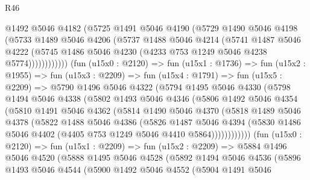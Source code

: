 \begin{lexlean}{R46}
\begin{coremodule}
                  @1492
                  @5046
                  @4182
                  (@5725
                    @1491
                    @5046
                    @4190
                    (@5729
                      @1490
                      @5046
                      @4198
                      (@5733
                        @1489
                        @5046
                        @4206
                        (@5737
                          @1488
                          @5046
                          @4214
                          (@5741
                            @1487
                            @5046
                            @4222
                            (@5745 @1486 @5046 @4230 (@4233 @753 @1249 @5046 @4238 @5774))))))))))))
        (fun (u15x0 : @2120) =>
        fun (u15x1 : @1736) =>
        fun (u15x2 : @1955) =>
        fun (u15x3 : @2209) =>
        fun (u15x4 : @1791) =>
        fun (u15x5 : @2209) =>
        @5790
          @1496
          @5046
          @4322
          (@5794
            @1495
            @5046
            @4330
            (@5798
              @1494
              @5046
              @4338
              (@5802
                @1493
                @5046
                @4346
                (@5806
                  @1492
                  @5046
                  @4354
                  (@5810
                    @1491
                    @5046
                    @4362
                    (@5814
                      @1490
                      @5046
                      @4370
                      (@5818
                        @1489
                        @5046
                        @4378
                        (@5822
                          @1488
                          @5046
                          @4386
                          (@5826
                            @1487
                            @5046
                            @4394
                            (@5830 @1486 @5046 @4402 (@4405 @753 @1249 @5046 @4410 @5864))))))))))))
        (fun (u15x0 : @2120) =>
        fun (u15x1 : @2209) =>
        fun (u15x2 : @2209) =>
        @5884
          @1496
          @5046
          @4520
          (@5888
            @1495
            @5046
            @4528
            (@5892
              @1494
              @5046
              @4536
              (@5896
                @1493
                @5046
                @4544
                (@5900
                  @1492
                  @5046
                  @4552
                  (@5904
                    @1491
                    @5046

\end{coremodule}
\end{lexlean}
